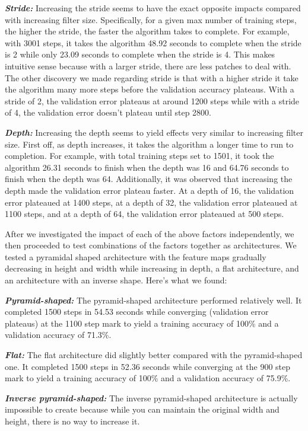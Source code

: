 \documentclass{article}
\begin{document}
\textbf{\textit{Stride:}}
Increasing the stride seems to have the exact opposite impacts compared with increasing filter size. Specifically, for a given max number of training steps, the higher the stride, the faster the algorithm takes to complete. For example, with 3001 steps, it takes the algorithm 48.92 seconds to complete when the stride is 2 while only 23.09 seconds to complete when the stride is 4. This makes intuitive sense because with a larger stride, there are less patches to deal with. The other discovery we made regarding stride is that with a higher stride it take the algorithm many more steps before the validation accuracy plateaus. With a stride of 2, the validation error plateaus at around 1200 steps while with a stride of 4, the validation error doesn't plateau until step 2800.

\textbf{\textit{Depth:}}
Increasing the depth seems to yield effects very similar to increasing filter size. First off, as depth increases, it takes the algorithm a longer time to run to completion. For example, with total training steps set to 1501, it took the algorithm 26.31 seconds to finish when the depth was 16 and 64.76 seconds to finish when the depth was 64. Additionally, it was observed that increasing the depth made the validation error plateau faster. At a depth of 16, the validation error plateaued at 1400 steps, at a depth of 32, the validation error plateaued at 1100 steps, and at a depth of 64, the validation error plateaued at 500 steps. 

After we investigated the impact of each of the above factors independently, we then proceeded to test combinations of the factors together as architectures. We tested a pyramidal shaped architecture with the feature maps gradually decreasing in height and width while increasing in depth, a flat architecture, and an architecture with an inverse shape. Here's what we found:


\textbf{\textit{Pyramid-shaped:}}
The pyramid-shaped architecture performed relatively well. It completed 1500 steps in 54.53 seconds while converging (validation error plateaus) at the 1100 step mark to yield a training accuracy of 100\% and a validation accuracy of 71.3\%.


\textbf{\textit{Flat:}}
The flat architecture did slightly better compared with the pyramid-shaped one. It completed 1500 steps in 52.36 seconds while converging at the 900 step mark to yield a training accuracy of 100\% and a validation accuracy of 75.9\%. 


\textbf{\textit{Inverse pyramid-shaped:}}
The inverse pyramid-shaped architecture is actually impossible to create because while you can maintain the original width and height, there is no way to increase it.
\end{document}
